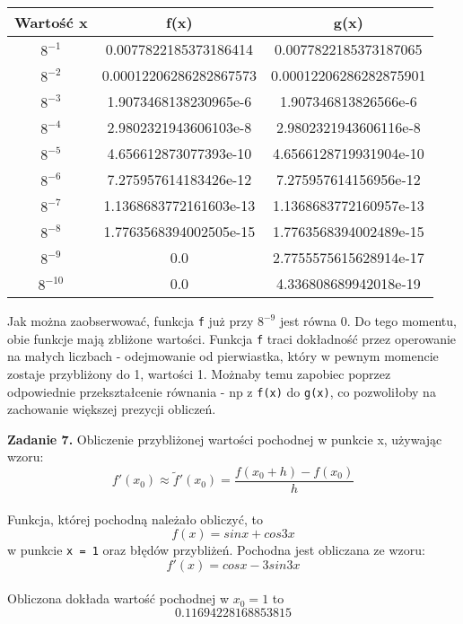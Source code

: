 \documentclass[15pt, a4paper]{article}
\begin{document}
\begin{table}[ht]
    \begin{tabular}{|c|c|c|}
        \hline 
        Wartość x & f(x) & g(x) \\ \hline
        $8^{\mathrm{-1}}$ & 0.0077822185373186414 & 0.0077822185373187065 \\ \hline
        $8^{\mathrm{-2}}$ & 0.00012206286282867573 & 0.00012206286282875901 \\ \hline
        $8^{\mathrm{-3}}$ & 1.9073468138230965e-6 & 1.907346813826566e-6 \\ \hline
        $8^{\mathrm{-4}}$ & 2.9802321943606103e-8 & 2.9802321943606116e-8 \\ \hline
        $8^{\mathrm{-5}}$ & 4.656612873077393e-10 & 4.6566128719931904e-10 \\ \hline
        $8^{\mathrm{-6}}$ & 7.275957614183426e-12 & 7.275957614156956e-12 \\ \hline
        $8^{\mathrm{-7}}$ & 1.1368683772161603e-13 & 1.1368683772160957e-13 \\ \hline
        $8^{\mathrm{-8}}$ & 1.7763568394002505e-15 & 1.7763568394002489e-15 \\ \hline
        $8^{\mathrm{-9}}$ & 0.0 & 2.7755575615628914e-17 \\ \hline
        $8^{\mathrm{-10}}$ & 0.0 & 4.336808689942018e-19 \\ \hline
    \end{tabular}
    \label{tab:fvsg}
\end{table}

Jak można zaobserwować, funkcja \verb|f| już przy $8^{-9}$ jest równa 0. Do tego momentu, obie funkcje mają zbliżone wartości. Funkcja \verb|f| traci dokładność przez operowanie na małych liczbach - odejmowanie od pierwiastka, który w pewnym momencie zostaje przybliżony do 1, wartości 1. Możnaby temu zapobiec poprzez odpowiednie przekształcenie równania - np z \verb|f(x)| do \verb|g(x)|, co pozwoliłoby na zachowanie większej prezycji obliczeń.

\vspace{0.5cm}

\noindent\hrulefill


\vspace{0.5cm}

\noindent\textbf{Zadanie 7.} Obliczenie przybliżonej wartości pochodnej w punkcie x, używając wzoru: \\
\[f'(x_0) \approx \tilde{f}'(x_0) = \frac{f(x_0 + h) - f(x_0)}{h}\] \\
Funkcja, której pochodną należało obliczyć, to 
\[f(x) = sinx + cos3x\]
w punkcie \verb|x = 1| oraz błędów przybliżeń. Pochodna jest obliczana ze wzoru:
\[f'(x) = cosx - 3sin3x \] \\
Obliczona dokłada wartość pochodnej w $x_0 = 1$ to
\[0.11694228168853815\]
\end{document}

